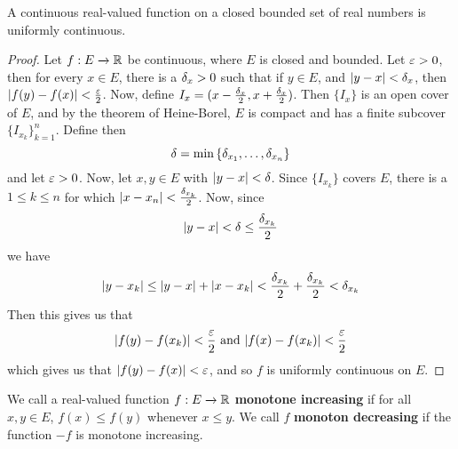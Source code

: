 \begin{theorem}\label{1.4.5}
    A continuous real-valued function on a closed bounded set of real numbers is
    uniformly continuous.
\end{theorem}
\begin{proof}
    Let $f:E \xrightarrow{} \mathbb{R}$ be continuous, where $E$ is closed and bounded.
    Let  $\varepsilon>0$, then for every  $x \in E$, there is a  $\delta_x>0$ such that if
    $y \in E$, and  $|y-x|<\delta_x$, then  $|f(y)-f(x)|<\frac{\varepsilon}{2}$. Now, define
    $I_x=(x-\frac{\delta_x}{2},x+\frac{\delta_x}{2})$. Then $\{I_x\}$ is an open cover
    of $E$, and by the theorem of Heine-Borel, $E$ is compact and has a finite
    subcover $\{I_{x_k}\}_{k=1}^n$. Define then
    \begin{equation*}
        \delta=\min{\{\delta_{x_1}, \dots, \delta_{x_n}\}}
    \end{equation*}
    and let $\varepsilon>0$. Now, let  $x,y \in E$ with  $|y-x|<\delta$. Since  $\{I_{x_k}\}$
    covers $E$, there is a  $1 \leq k \leq n$ for which
    $|x-x_n|<\frac{\delta_{x_k}}{2}$. Now, since
    \begin{equation*}
        |y-x|<\delta \leq \frac{\delta_{x_k}}{2}
    \end{equation*}
    we have
    \begin{equation*}
        |y-x_k| \leq |y-x|+|x-x_k|<\frac{\delta_{x_k}}{2}+\frac{\delta_{x_k}}{2}<\delta_{x_k}
    \end{equation*}
    Then this gives us that
    \begin{equation*}
        |f(y)-f(x_k)|<\frac{\varepsilon}{2} \text{ and } |f(x)-f(x_k)|<\frac{\varepsilon}{2}
    \end{equation*}
    which gives us that $|f(y)-f(x)|<\varepsilon$, and so $f$ is uniformly continuous on
     $E$.
\end{proof}

\begin{definition}
    We call a real-valued function $f:E \xrightarrow{} \mathbb{R}$ \textbf{monotone
    increasing} if for all $x,y \in E$,  $f(x) \leq f(y)$ whenever $x \leq y$.
    We call  $f$  \textbf{monoton decreasing} if the function $-f$ is monotone
    increasing.
\end{definition}
